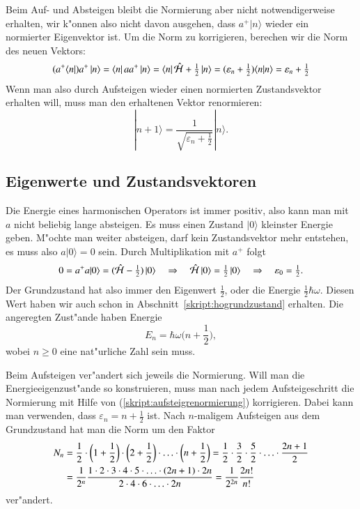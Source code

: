 Beim Auf- und Absteigen bleibt die Normierung aber nicht notwendigerweise
erhalten, wir k"onnen also nicht davon ausgehen, dass $a^+|n\rangle$
wieder ein normierter Eigenvektor ist.
Um die Norm zu korrigieren, berechen wir die Norm des neuen Vektors:
\[
(a^+\langle n|) a^+\,|n\rangle
=
\langle n|\,aa^+\,|n\rangle
=
\langle n|\,\hat{\cal H}+{\textstyle\frac12}\,|n\rangle
=
(\varepsilon_n+{\textstyle\frac12})\langle n|n\rangle
=
\varepsilon_n+\textstyle\frac12
\]
Wenn man also durch Aufsteigen wieder einen normierten Zustandsvektor
erhalten will, muss man den erhaltenen Vektor renormieren:
\begin{equation}
|n+1\rangle = \frac1{\sqrt{\varepsilon_n+\textstyle\frac12}}|n\rangle.
\label{skript:aufsteigrenormierung}
\end{equation}

\subsection{Eigenwerte und Zustandsvektoren}
Die Energie eines harmonischen Operators ist immer positiv,
also kann man mit $a$ nicht beliebig lange absteigen. Es muss einen
Zustand $|0\rangle$ kleinster Energie geben. M"ochte man weiter
absteigen, darf kein Zustandsvektor mehr entstehen, es muss also
$a|0\rangle=0$ sein. Durch Multiplikation mit $a^+$ folgt
\[
0=a^+a|0\rangle=(\hat{\cal H}-\textstyle\frac12)\,|0\rangle
\quad
\Rightarrow
\quad
\hat{\cal H}\,|0\rangle=\frac12\,|0\rangle
\quad
\Rightarrow
\quad
\varepsilon_0=\frac12.
\]
Der Grundzustand hat also immer den Eigenwert $\frac12$, oder die
Energie $\frac12\hbar\omega$. Diesen Wert haben wir auch schon in
Abschnitt~\ref{skript:hogrundzustand} erhalten.
Die angeregten Zust"ande haben Energie
\[
E_n
=
\hbar\omega\biggl(n+\frac12\biggr),
\]
wobei $n\ge 0$ eine nat"urliche Zahl sein muss.

Beim Aufsteigen ver"andert sich jeweils die Normierung.
Will man die Energieeigenzust"ande so konstruieren, muss man nach jedem
Aufsteigeschritt die Normierung mit Hilfe von (\ref{skript:aufsteigrenormierung})
korrigieren. Dabei kann man verwenden, dass $\varepsilon_n = n+\frac12$
ist. Nach $n$-maligem Aufsteigen aus dem Grundzustand hat man die
Norm um den Faktor
\begin{align}
N_n
&=
\frac12\cdot\biggl(1+\frac12\biggr)\cdot\biggl(2+\frac12\biggr)\cdot\ldots\cdot
\biggl(n+\frac12\biggr)
=
\frac12\cdot\frac32\cdot\frac52\cdot\ldots\cdot\frac{2n+1}2
\notag
\\
&=
\frac1{2^n}
\frac{1\cdot 2\cdot 3\cdot 4\cdot 5\cdot \ldots \cdot (2n+1)\cdot 2n}%
{2\cdot 4\cdot 6\cdot \ldots \cdot 2n}
=\frac1{2^{2n}}\frac{2n!}{n!}
\label{skript:aufsteigrenormierungn}
\end{align}
ver"andert.


